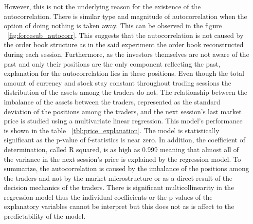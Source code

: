However, this is not the underlying reason for the existence of the autocorrelation. There is similar type and
magnitude of autocorrelation when the option of doing nothing is taken away. This can be observed in the figure 
~\ref{fig:forcesub_autocorr}. This suggests that the autocorrelation is not caused by the order book structure
as in the said experiment the order book reconstructed during each session. Furthermore, as the investors themselves are
not aware of the past and only their positions are the only component reflecting the past, explanation for the 
autocorrelation lies in these positions. Even though the total amount of currency and stock stay constant throughout
trading sessions the distribution of the assets among the traders do not. The relationship between the imbalance
of the assets between the traders, represented as the standard deviation of the positions among the traders, and
the next session's last market price is studied using a multivariate linear regression. This model's performance is
shown in the table ~\ref{tbl:price_explanation}. The model is statistically significant as the p-value of f-statistics
is near zero. In addition, the coefficient of determination, called R squared, is as high as 0.999 meaning that
almost all of the variance in the next session's price is explained by the regression model. To summarize, the
autocorrelation is caused by the imbalance of the positions among the traders and not by the market microstructure
or as a direct result of the decision mechanics of the traders. There is significant multicollinearity in the regression
model thus the individual coefficients or the p-values of the explanatory variables cannot be interpret but this 
does not as is affect to the predictability of the model. 


